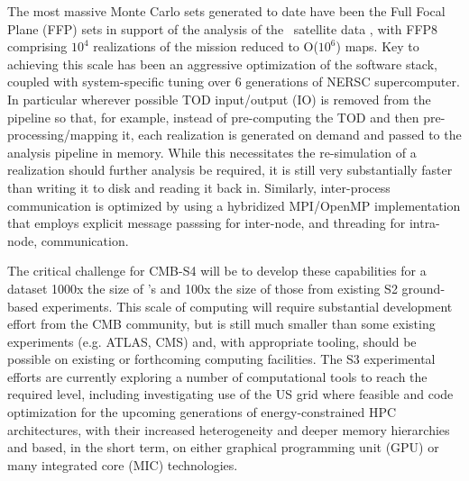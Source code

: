 The most massive Monte Carlo sets generated to date have been the Full Focal Plane (FFP) sets in support of the analysis of the \planck\ satellite data \cite{Ade:2015via}, with FFP8 comprising $10^4$ realizations of the mission reduced to O($10^6$) maps. Key to achieving this scale has been an aggressive optimization of the software stack, coupled with system-specific tuning over 6 generations of NERSC supercomputer. In particular wherever possible TOD input/output (IO) is removed from the pipeline so that, for example, instead of pre-computing the TOD and then pre-processing/mapping it, each realization is generated on demand and passed to the analysis pipeline in memory. While this necessitates the re-simulation of a realization should further analysis be required, it is still very substantially faster than writing it to disk and reading it back in. Similarly, inter-process communication is optimized by using a hybridized MPI/OpenMP implementation that employs explicit message passsing for inter-node, and threading for intra-node, communication.

The critical challenge for CMB-S4 will be to develop these capabilities for a dataset 1000x the size of \planck's and 100x the size of those from existing S2 ground-based experiments. This scale of computing will require substantial development effort from the CMB community, but is still much smaller than some existing experiments (e.g. ATLAS, CMS) and, with appropriate tooling, should be possible on existing or forthcoming computing facilities. The S3 experimental efforts are currently exploring a number of computational tools to reach the required level, including investigating use of the US grid where feasible and code optimization for the upcoming generations of energy-constrained HPC architectures, with their increased heterogeneity and deeper memory hierarchies and based, in the short term, on either graphical programming unit (GPU) or many integrated core (MIC) technologies.


